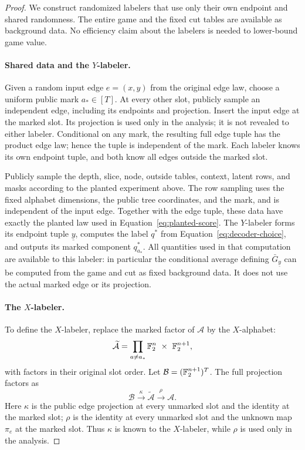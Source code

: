 \begin{proof}
We construct randomized labelers that use only their own endpoint
and shared randomness.  The entire game and the fixed cut tables
are available as background data.  No efficiency claim about the
labelers is needed to lower-bound game value.

\paragraph{Shared data and the $Y$-labeler.}
Given a random input edge $e=(x,y)$ from the original edge law,
choose a uniform public mark $a_*\in[T]$.  At every other slot,
publicly sample an independent edge, including its endpoints and
projection.  Insert the input edge at the marked slot.  Its
projection is used only in the analysis; it is not revealed to
either labeler.  Conditional on any mark, the resulting full edge
tuple has the product edge law; hence the tuple is independent of
the mark.  Each labeler knows its own endpoint tuple, and both know
all edges outside the marked slot.

Publicly sample the depth, slice, node, outside tables, context,
latent rows, and masks according to the planted experiment above.
The row sampling uses the fixed alphabet dimensions, the public
tree coordinates, and the mark, and is independent of the input edge.
Together with the edge tuple, these data have exactly the planted
law used in Equation~\eqref{eq:planted-score}.  The $Y$-labeler
forms its endpoint tuple $\underline y$, computes the label $q^*$
from Equation~\eqref{eq:decoder-choice}, and outputs its marked
component $q^*_{a_*}$.  All quantities used in that computation are
available to this labeler: in particular the conditional average
defining $\bar G_{\underline y}$ can be computed from the game and
cut as fixed background data.  It does not use the actual marked
edge or its projection.

\paragraph{The $X$-labeler.}
To define the $X$-labeler, replace the marked factor of $\mathcal A$
by the $X$-alphabet:
\[
 \widetilde{\mathcal A}
 =\prod_{a\ne a_*}\mathbb F_2^n\ \times\ \mathbb F_2^{n+1},
\]
with factors in their original slot order.  Let
$\mathcal B=(\mathbb F_2^{n+1})^T$.  The full projection factors as
\[
 \mathcal B\xrightarrow{\ \kappa\ }
 \widetilde{\mathcal A}\xrightarrow{\ \rho\ }\mathcal A.
\]
Here $\kappa$ is the public edge projection at every unmarked slot
and the identity at the marked slot; $\rho$ is the identity at
every unmarked slot and the unknown map $\pi_e$ at the marked
slot.  Thus $\kappa$ is known to the $X$-labeler, while $\rho$ is
used only in the analysis.


\end{proof}
